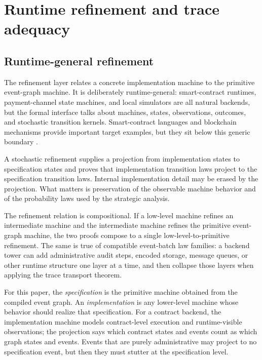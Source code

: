 \section{Runtime refinement and trace adequacy}
\label{sec:refinement}

\subsection{Runtime-general refinement}

The refinement layer relates a concrete implementation machine to the
primitive event-graph machine.  It is deliberately runtime-general:
smart-contract runtimes, payment-channel state machines, and local
simulators are all natural backends, but the formal interface talks
about machines, states, observations, outcomes, and stochastic transition
kernels.  Smart-contract languages and blockchain mechanisms provide
important target examples, but they sit below this generic boundary
\citep{Sergey2019Scilla,Lamela2020Marlowe,Roughgarden2021EIP1559}.

A stochastic refinement supplies a projection from implementation states
to specification states and proves that implementation transition laws
project to the specification transition laws.  Internal implementation
detail may be erased by the projection.  What matters is preservation of
the observable machine behavior and of the probability laws used by the
strategic analysis.

The refinement relation is compositional.  If a low-level machine refines
an intermediate machine and the intermediate machine refines the
primitive event-graph machine, the two proofs compose to a single
low-level-to-primitive refinement.  The same is true of compatible
event-batch law families: a backend tower can add administrative audit
steps, encoded storage, message queues, or other runtime structure one
layer at a time, and then collapse those layers when applying the trace
transport theorem.

For this paper, the \emph{specification} is the primitive machine
obtained from the compiled event graph.  An \emph{implementation} is any
lower-level machine whose behavior should realize that specification.
For a contract backend, the implementation machine models
contract-level execution and runtime-visible observations; the projection
says which contract states and events count as which graph states and
events.  Events that are purely administrative may project to no
specification event, but then they must stutter at the specification
level.

